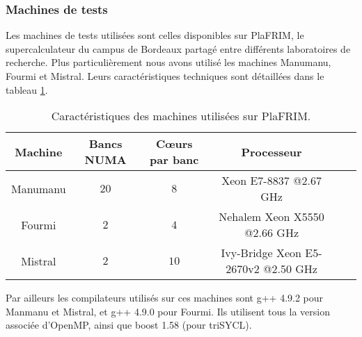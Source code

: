 \subsubsection*{Machines de tests}

Les machines de tests utilisées sont celles disponibles sur \textsf{PlaFRIM}, le supercalculateur du campus de Bordeaux partagé entre différents laboratoires de recherche. Plus particulièrement nous avons utilisé les machines \textsf{Manumanu}, \textsf{Fourmi} et \textsf{Mistral}. Leurs caractéristiques techniques sont détaillées dans le tableau \ref{tab:carac_mach}.

\begin{table}
{
\caption{Caractéristiques des machines utilisées sur \textsf{PlaFRIM}.}
\label{tab:carac_mach}
}
{
\begin{tabular}{||c||c|c|c|c|c||}
\hline
Machine & Bancs NUMA & Cœurs par banc & Processeur\\%
\hline
\hline
Manumanu & $20$ & $8$ & Xeon E7-8837 @2.67 GHz \\%
Fourmi & $2$ & $4$ & Nehalem Xeon X5550 @2.66 GHz \\%
Mistral & $2$ & $10$ & Ivy-Bridge Xeon E5-2670v2 @2.50 GHz \\%
\hline
\end{tabular}
}
\end{table} 

Par ailleurs les compilateurs utilisés sur ces machines sont \textsf{g++ 4.9.2} pour \textsf{Manmanu} et \textsf{Mistral}, et \textsf{g++ 4.9.0} pour \textsf{Fourmi}. Ils utilisent tous la version associée d'\textsf{OpenMP}, ainsi que \textsf{boost 1.58} (pour \textsf{triSYCL}).

